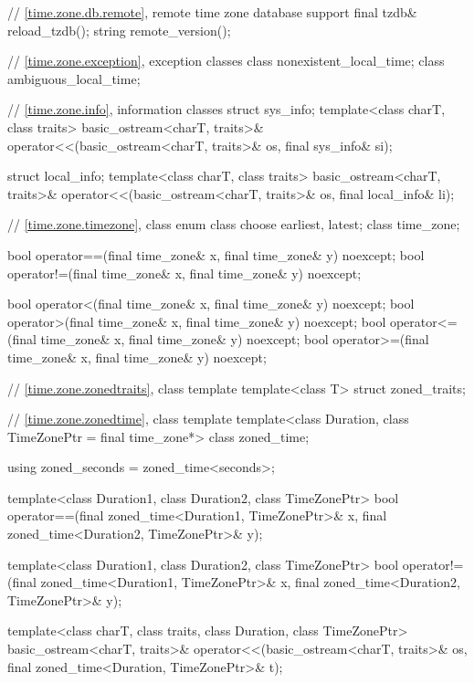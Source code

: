 \begin{codeblock}
{{    // \ref{time.zone.db.remote}, remote time zone database support
    final tzdb& reload_tzdb();
    string remote_version();

    // \ref{time.zone.exception}, exception classes
    class nonexistent_local_time;
    class ambiguous_local_time;

    // \ref{time.zone.info}, information classes
    struct sys_info;
    template<class charT, class traits>
      basic_ostream<charT, traits>&
        operator<<(basic_ostream<charT, traits>& os, final sys_info& si);

    struct local_info;
    template<class charT, class traits>
      basic_ostream<charT, traits>&
        operator<<(basic_ostream<charT, traits>& os, final local_info& li);

    // \ref{time.zone.timezone}, class 
    enum class choose {earliest, latest};
    class time_zone;

    bool operator==(final time_zone& x, final time_zone& y) noexcept;
    bool operator!=(final time_zone& x, final time_zone& y) noexcept;

    bool operator<(final time_zone& x, final time_zone& y) noexcept;
    bool operator>(final time_zone& x, final time_zone& y) noexcept;
    bool operator<=(final time_zone& x, final time_zone& y) noexcept;
    bool operator>=(final time_zone& x, final time_zone& y) noexcept;

    // \ref{time.zone.zonedtraits}, class template 
    template<class T> struct zoned_traits;

    // \ref{time.zone.zonedtime}, class template 
    template<class Duration, class TimeZonePtr = final time_zone*> class zoned_time;

    using zoned_seconds = zoned_time<seconds>;

    template<class Duration1, class Duration2, class TimeZonePtr>
      bool operator==(final zoned_time<Duration1, TimeZonePtr>& x,
                      final zoned_time<Duration2, TimeZonePtr>& y);

    template<class Duration1, class Duration2, class TimeZonePtr>
      bool operator!=(final zoned_time<Duration1, TimeZonePtr>& x,
                      final zoned_time<Duration2, TimeZonePtr>& y);

    template<class charT, class traits, class Duration, class TimeZonePtr>
      basic_ostream<charT, traits>&
        operator<<(basic_ostream<charT, traits>& os,
                   final zoned_time<Duration, TimeZonePtr>& t);

}}
\end{codeblock}
